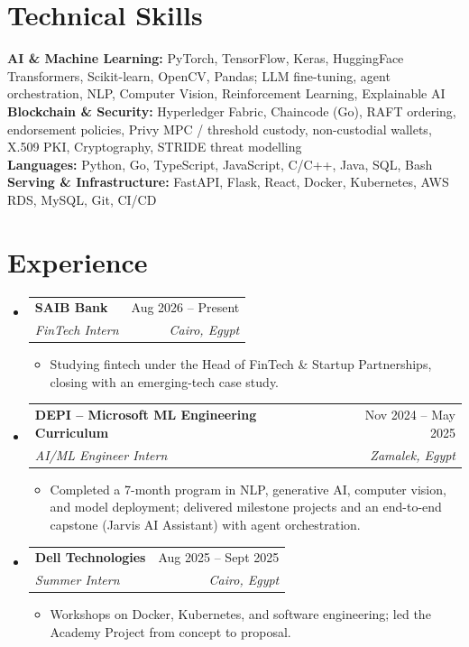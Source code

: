\documentclass[letterpaper,11pt]{article}
\makeatletter
\newcommand{\resumeItem}[1]{
  \item\small{
    {#1 \vspace{-2pt}}
  }
}
\newcommand{\resumeSubheading}[4]{
  \vspace{-2pt}\item
    \begin{tabular*}{\textwidth}[t]{l@{\extracolsep{\fill}}r}
      \textbf{#1} & #2 \\
      \textit{\small#3} & \textit{\small #4} \\
    \end{tabular*}\vspace{-7pt}
}
\newcommand{\resumeSubHeadingListStart}{\begin{itemize}[leftmargin=0in, label={}]}
\newcommand{\resumeSubHeadingListEnd}{\end{itemize}}
\newcommand{\resumeItemListStart}{\begin{itemize}[leftmargin=0.2in, itemsep=0pt, parsep=0pt]}
\newcommand{\resumeItemListEnd}{\end{itemize}\vspace{-5pt}}
\makeatother
\begin{document}
\section{Technical Skills}
 \begin{itemize}[leftmargin=0in, label={}]
    \small{\item{
     \textbf{AI \& Machine Learning:} PyTorch, TensorFlow, Keras, HuggingFace Transformers, Scikit-learn, OpenCV, Pandas; LLM fine-tuning, agent orchestration, NLP, Computer Vision, Reinforcement Learning, Explainable AI \\
     \textbf{Blockchain \& Security:} Hyperledger Fabric, Chaincode (Go), RAFT ordering, endorsement policies, Privy MPC / threshold custody, non-custodial wallets, X.509 PKI, Cryptography, STRIDE threat modelling \\
     \textbf{Languages:} Python, Go, TypeScript, JavaScript, C/C++, Java, SQL, Bash \\
     \textbf{Serving \& Infrastructure:} FastAPI, Flask, React, Docker, Kubernetes, AWS RDS, MySQL, Git, CI/CD
    }}
 \end{itemize}


\section{Experience}
  \resumeSubHeadingListStart

    \resumeSubheading
      {SAIB Bank}{Aug 2026 -- Present}
      {FinTech Intern}{Cairo, Egypt}
      \resumeItemListStart
        \resumeItem{Studying fintech under the Head of FinTech \& Startup Partnerships, closing with an emerging-tech case study.}
      \resumeItemListEnd

    \resumeSubheading
      {DEPI -- Microsoft ML Engineering Curriculum}{Nov 2024 -- May 2025}
      {AI/ML Engineer Intern}{Zamalek, Egypt}
      \resumeItemListStart
        \resumeItem{Completed a 7-month program in NLP, generative AI, computer vision, and model deployment; delivered milestone projects and an end-to-end capstone (Jarvis AI Assistant) with agent orchestration.}
      \resumeItemListEnd

    \resumeSubheading
      {Dell Technologies}{Aug 2025 -- Sept 2025}
      {Summer Intern}{Cairo, Egypt}
      \resumeItemListStart
        \resumeItem{Workshops on Docker, Kubernetes, and software engineering; led the Academy Project from concept to proposal.}
      \resumeItemListEnd

  \resumeSubHeadingListEnd
\end{document}
